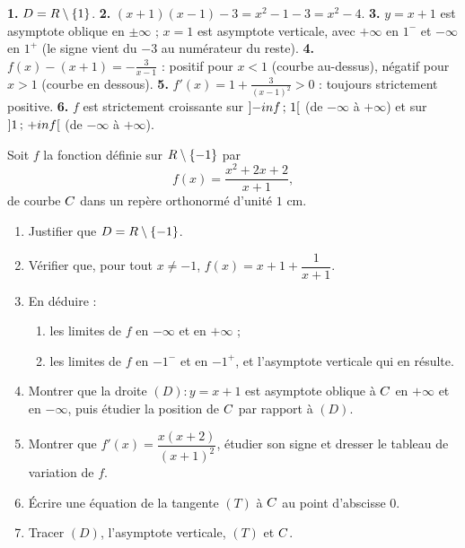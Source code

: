 \begin{corrige}[je me teste]
\textbf{1.} $D = R\setminus\{1\}$.
\textbf{2.} $(x+1)(x-1)-3 = x^{2}-1-3 = x^{2}-4$. \checkmark
\textbf{3.} $y = x+1$ est asymptote oblique en $\pm\infty$ ; $x = 1$ est
asymptote verticale, avec $+\infty$ en $1^{-}$ et $-\infty$ en $1^{+}$ (le
signe vient du $-3$ au numérateur du reste).
\textbf{4.} $f(x)-(x+1) = -\frac{3}{x-1}$ : positif pour $x<1$ (courbe
au-dessus), négatif pour $x>1$ (courbe en dessous).
\textbf{5.} $f'(x) = 1+\frac{3}{(x-1)^{2}} > 0$ : toujours strictement
positive.
\textbf{6.} $f$ est strictement croissante sur $\left]-inf\,;\,1\right[$
(de $-\infty$ à $+\infty$) et sur $\left]1\,;\,+inf\right[$ (de $-\infty$
à $+\infty$).
\end{corrige}

\begin{commeaubac}
Soit $f$ la fonction définie sur $R\setminus\{-1\}$ par
\[
  f(x) = \frac{x^{2}+2x+2}{x+1},
\]
de courbe $C$ dans un repère orthonormé d'unité $1$ cm.

\begin{enumerate}[label=\textbf{\arabic*.}, leftmargin=*, itemsep=0.25em]
  \item Justifier que $D = R\setminus\{-1\}$. 
  \item Vérifier que, pour tout $x \neq -1$,
        $f(x) = x+1+\dfrac{1}{x+1}$. 
  \item En déduire :
    \begin{enumerate}[label=\textbf{\alph*)}, leftmargin=1.4em, itemsep=0.15em]
      \item les limites de $f$ en $-\infty$ et en $+\infty$ ;
      \item les limites de $f$ en $-1^{-}$ et en $-1^{+}$, et l'asymptote
            verticale qui en résulte. 
    \end{enumerate}
  \item Montrer que la droite $(D) : y = x+1$ est asymptote oblique à $C$
        en $+\infty$ et en $-\infty$, puis étudier la position de $C$ par
        rapport à $(D)$. 
  \item Montrer que $f'(x) = \dfrac{x(x+2)}{(x+1)^{2}}$, étudier son signe et
        dresser le tableau de variation de $f$. 
  \item Écrire une équation de la tangente $(T)$ à $C$ au point d'abscisse
        $0$. 
  \item Tracer $(D)$, l'asymptote verticale, $(T)$ et $C$. 
\end{enumerate}
\end{commeaubac}

